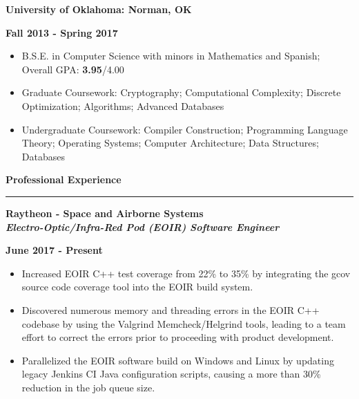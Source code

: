\documentclass[10pt,letterpaper]{article}
\begin{document}
\begin{minipage}[t]{0.5\textwidth}
	\begin{flushleft}
		\textbf{University of Oklahoma: Norman, OK}\\
		
	\end{flushleft}
\end{minipage}
\begin{minipage}[t]{0.47\textwidth}
	\begin{flushright}
		\textbf{Fall 2013 - Spring 2017}
		
	\end{flushright}
\end{minipage}
\begin{itemize}[topsep=0pt]
	\setlength\itemsep{-0.10em}
	\item B.S.E. in Computer Science with minors in Mathematics and Spanish; Overall GPA: \textbf{3.95}/{4.00}
	\item Graduate Coursework: Cryptography; Computational Complexity; Discrete Optimization;
	      Algorithms; Advanced Databases
	\item Undergraduate Coursework: Compiler Construction; Programming Language Theory;
	      Operating Systems; Computer Architecture; Data Structures; Databases
\end{itemize}

\medskip

\begin{large}
	\textbf{Professional Experience}
\end{large}

\smallskip \hrule \smallskip

\begin{minipage}[t]{0.53\textwidth}
	\begin{flushleft}
		\textbf{Raytheon - Space and Airborne Systems}\\
		\textbf{\textit{Electro-Optic/Infra-Red Pod (EOIR) Software Engineer}}\\
	\end{flushleft}
\end{minipage}
\begin{minipage}[t]{0.44\textwidth}
	\begin{flushright}
		\textbf{June 2017 - Present}
	\end{flushright}
\end{minipage}

\begin{itemize}[noitemsep,topsep=0pt]
	\setlength\itemsep{-0.10em}
	\item Increased EOIR C++ test coverage from 22\% to 35\% by integrating the gcov
	      source code coverage tool into the EOIR build system.
	\item Discovered numerous memory and threading errors in the EOIR C++ codebase
	      by using the Valgrind Memcheck/Helgrind tools, leading to a team effort to correct
	      the errors prior to proceeding with product development.
	\item Parallelized the EOIR software build on Windows and Linux by updating legacy Jenkins
	      CI Java configuration scripts, causing a more than 30\% reduction in the job
	      queue size.
\end{itemize}
\end{document}
